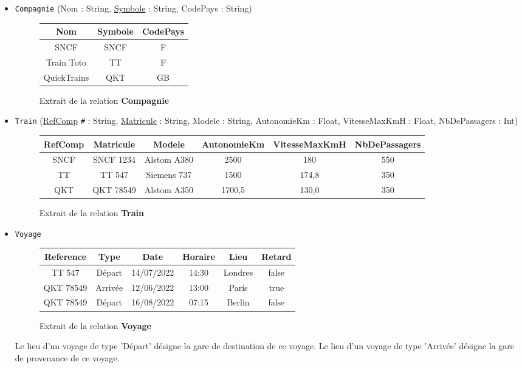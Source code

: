\documentclass[11pt,a4paper,french,twoside]{PMCours}
\begin{document}
\begin{itemize}
\item \verb'Compagnie' (Nom : String, \underline{Symbole} : String, CodePays : String)
\begin{figure}[ht]
\begin{center}
\begin{tabular}{|c|c|c|}\hline
Nom & Symbole & CodePays\\\hline
SNCF & SNCF & F\\\hline
Train Toto & TT & F\\\hline
QuickTrains & QKT & GB\\\hline
\end{tabular}
\end{center}
\caption{Extrait de la relation \textbf{Compagnie}}
\end{figure}
\end{itemize}

\begin{itemize}
\item \verb'Train' (\underline{RefComp} \verb'#' : String, \underline{Matricule} : String, Modele : String, AutonomieKm : Float, VitesseMaxKmH : Float, NbDePassagers : Int)
\begin{figure}[ht]
\begin{center}
\begin{tabular}{|c|c|c|c|c|c|}\hline
RefComp & Matricule & Modele & AutonomieKm & VitesseMaxKmH & NbDePassagers\\\hline
SNCF & SNCF 1234 & Alstom A380 & 2500 & 180 & 550\\\hline
TT & TT 547 & Siemens 737 & 1500 & 174,8 & 350\\\hline
QKT & QKT 78549 & Alstom A350 & 1700,5 & 130,0 & 350\\\hline
\end{tabular}
\end{center}
\caption{Extrait de la relation \textbf{Train}}
\end{figure}
\end{itemize}
\begin{itemize}
\item \verb'Voyage' 
\begin{figure}[ht]
\begin{center}
\begin{tabular}{|c|c|c|c|c|c|}\hline
Reference & Type & Date & Horaire & Lieu & Retard\\\hline
TT 547 & Départ & 14/07/2022 & 14:30 & Londres & false\\\hline
QKT 78549 & Arrivée & 12/06/2022 & 13:00 & Paris & true\\\hline
QKT 78549 & Départ & 16/08/2022 & 07:15 & Berlin & false\\\hline
\end{tabular}
\end{center}
\caption{Extrait de la relation \textbf{Voyage}}
\end{figure}

Le lieu d'un voyage de type 'Départ' désigne la gare de destination de ce voyage. Le lieu d'un voyage de type 'Arrivée' désigne la gare de provenance de ce voyage. 
\end{itemize}
\end{document}
